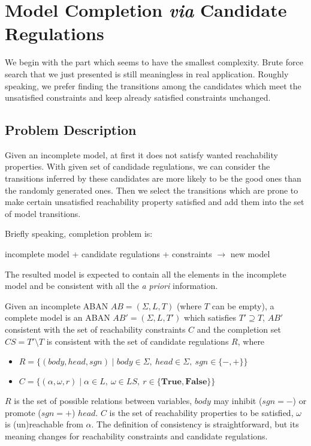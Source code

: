 \section{Model Completion \textit{via} Candidate Regulations}\label{sec:modelInference}
We begin with the part which seems to have the smallest complexity.
Brute force search that we just presented is still meaningless in real application.
Roughly speaking, we prefer finding the transitions among the candidates which meet the unsatisfied constraints and keep already satisfied constraints unchanged.

\subsection{Problem Description}
Given an incomplete model, at first it does not satisfy wanted reachability properties.
With given set of candidade regulations, we can consider the transitions inferred by these candidates are more likely to be the good ones than the randomly generated ones.
Then we select the transitions which are prone to make certain unsatisfied reachability property satisfied and add them into the set of model transitions.

Briefly speaking, completion problem is:

incomplete model + candidate regulations + constraints $\to$ new model

The resulted model is expected to contain all the elements in the incomplete model and be consistent with all the \textit{a priori} information. 

\begin{definition}
    Given an incomplete ABAN $AB=(\Sigma, L, T)$ (where $T$ can be empty), a complete model is an ABAN $AB'=(\Sigma, L, T')$ which satisfies $T'\supseteq T$, $AB'$ consistent with the set of reachability constraints $C$ and the completion set $CS=T'\setminus T$ is consistent with the set of candidate regulations $R$, where
    \begin{itemize}
        \item $R=\{(body,head,sgn)\mid body\in \Sigma,\ head\in \Sigma,\ sgn\in \{-,+\}\}$ 
        \item $C=\{(\alpha,\omega,r)\mid\alpha \in L,\ \omega\in LS,\ r\in \{\mathbf{True,False}\}\}$
    \end{itemize}
\end{definition}

$R$ is the set of possible relations between variables, $body$ may inhibit ($sgn=-$) or promote ($sgn=+$) $head$.
$C$ is the set of reachability properties to be satisfied, $\omega$ is (un)reachable from $\alpha$.
The definition of consistency is straightforward, but its meaning changes for reachability constraints and candidate regulations.

